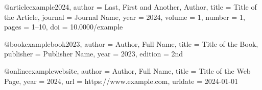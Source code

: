  
@article{example2024,
    author  = {Last, First and Another, Author},
    title   = {Title of the Article},
    journal = {Journal Name},
    year    = {2024},
    volume  = {1},
    number  = {1},
    pages   = {1--10},
    doi     = {10.0000/example}
}
 
@book{examplebook2023,
    author    = {Author, Full Name},
    title     = {Title of the Book},
    publisher = {Publisher Name},
    year      = {2023},
    edition   = {2nd}
}
 
@online{examplewebsite,
    author  = {Author, Full Name},
    title   = {Title of the Web Page},
    year    = {2024},
    url     = {https://www.example.com},
    urldate = {2024-01-01}
}

